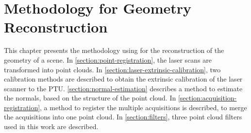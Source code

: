 \chapter{Methodology for Geometry Reconstruction}

This chapter presents the methodology using for the reconstruction of the geometry of a scene. In \cref{section:point-registration}, the laser scans are transformed into point clouds. In \cref{section:laser-extrinsic-calibration}, two calibration methods are described to obtain the extrinsic calibration of the laser scanner to the PTU. \cref{section:normal-estimation} describes a method to estimate the normals, based on the structure of the point cloud. In \cref{section:acquisition-registration}, a method to register the multiple acquisitions is described, to merge the acquisitions into one point cloud. In \cref{section:filters}, three point cloud filters used in this work are described.


\FloatBarrier

\FloatBarrier

\FloatBarrier

\FloatBarrier

\FloatBarrier
